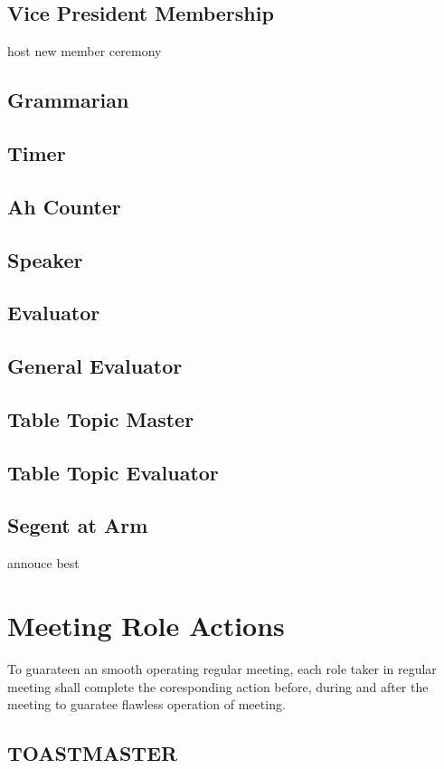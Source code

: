 \subsection{Vice President Membership}
host new member ceremony

\subsection{Grammarian}
\subsection{Timer}
\subsection{Ah Counter}
\subsection{Speaker}
\subsection{Evaluator}
\subsection{General Evaluator}
\subsection{Table Topic Master}
\subsection{Table Topic Evaluator}
\subsection{Segent at Arm}
annouce best


\section{Meeting Role Actions}

To guarateen an smooth operating regular meeting, each role taker 
in regular meeting shall complete the coresponding action before,
during and after the meeting to guaratee flawless operation of 
meeting. 

\subsection{TOASTMASTER}

